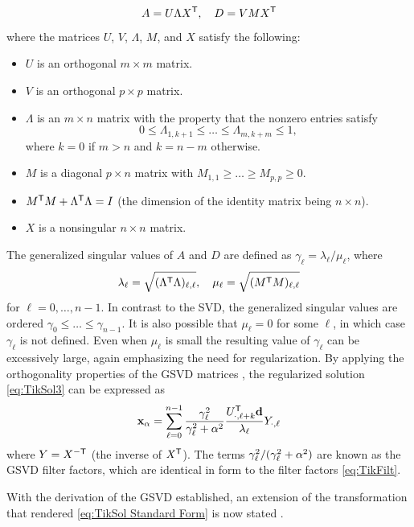 \begin{equation}
\label{eq:GSVD matrices}
A = U\Lambda {X}^\mathsf{T}, \quad D = VM{X}^\mathsf{T}
\end{equation}
where the matrices $U$, $V$, $\Lambda$, $M$, and $X$ satisfy the following: 
\begin{itemize}
\item $U$ is an orthogonal $m \times m$ matrix. 
\item $V$ is an orthogonal $p \times p$ matrix.
\item $\Lambda$ is an $m \times n$ matrix with the property that the nonzero entries satisfy
\[0 \leq \Lambda_{1,k+1} \leq \ldots \leq \Lambda_{m,k+m} \leq 1,\]
where $k = 0$ if $m > n$ and $k = n-m$ otherwise. 
\item $M$ is a diagonal $p \times n$ matrix with $M_{1,1} \geq \ldots \geq M_{p,p} \geq 0.$
\item ${M}^\mathsf{T} M + {\Lambda}^\mathsf{T} \Lambda = I$ (the dimension of the identity matrix being $n \times n$).
\item $X$ is a nonsingular $n \times n$ matrix.
\end{itemize}
The generalized singular values of $A$ and $D$ are defined as $\gamma_\ell = \lambda_{\ell}/\mu_{\ell}$, where
\begin{equation}
\label{eq:GSVD lambda}
\lambda_\ell = \sqrt{({\Lambda}^\mathsf{T} \Lambda)_{\ell,\ell}}, \quad \mu_\ell = \sqrt{({M}^\mathsf{T} M)_{\ell,\ell}}
\end{equation}
for $\ell = 0,\ldots,{n-1}$. In contrast to the SVD, the generalized singular values are ordered $\gamma_0 \leq \ldots \leq \gamma_{n-1}$. It is also possible that $\mu_\ell = 0$ for some $\ell$, in which case $\gamma_\ell$ is not defined. Even when $\mu_\ell$ is small the resulting value of $\gamma_\ell$ can be excessively large, again emphasizing the need for regularization. By applying the orthogonality properties of the GSVD matrices \cite[p.~105-106]{ABT}, the regularized solution \eqref{eq:TikSol3} can be expressed as
\begin{equation}
\label{eq:TikSol GSVD}
\mathbf{x}_\alpha = \sum_{\ell=0}^{n-1} \frac{\gamma_\ell^2}{\gamma_\ell^2 + \alpha^2} \frac{{U}^\mathsf{T}_{\cdot,\ell+k}\mathbf{d}}{\lambda_\ell}Y_{\cdot,\ell}
\end{equation}
where $Y = {X}^{-\mathsf{T}}$ (the inverse of ${X}^\mathsf{T}$). The terms $\gamma_\ell^2/(\gamma_\ell^2 + \alpha^2)$ are known as the GSVD filter factors, which are identical in form to the filter factors \eqref{eq:TikFilt}. \par 
With the derivation of the GSVD established, an extension of the transformation that rendered \eqref{eq:TikSol Standard Form} is now stated \cite[p.~38]{Hansen:98}. 


